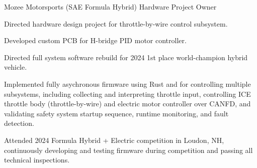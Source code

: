 \documentclass[11pt]{article}
\begin{document}


\sectiondate
{Mozee Motorsports (SAE Formula Hybrid)}
{Hardware Project Owner} {}  

{\vspace{-1.4ex}}
\begin{circlist}
	\item Directed hardware design project for throttle-by-wire control subsystem. 
	\item Developed custom PCB for H-bridge PID motor controller. 
\end{circlist}
{\vspace{-1.4ex}}
\begin{circlist}
	\item Directed full system software rebuild for 2024 1st place world-champion hybrid vehicle.
	\item Implemented fully asychronous firmware using Rust and  for controlling multiple subsystems, including collecting and interpreting throttle input, controlling ICE throttle body (throttle-by-wire) and electric motor controller over CANFD, and validating safety system startup sequence, runtime monitoring, and fault detection.
	\item Attended 2024 Formula Hybrid + Electric competition in Loudon, NH, continuously developing and testing firmware during competition and passing all technical inspections.
\end{circlist}


\end{document}
